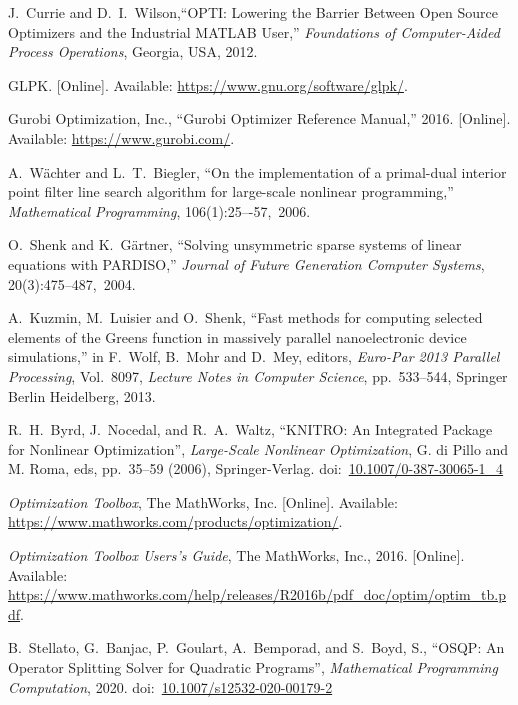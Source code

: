 \documentclass[12pt]{article}
\numberwithin{equation}{section}
\numberwithin{table}{section}
\numberwithin{figure}{section}
\begin{document}
\begin{thebibliography}{99}
J.~Currie and D.~I.~Wilson,``OPTI: Lowering the Barrier Between Open Source Optimizers and the Industrial MATLAB User,'' \emph{Foundations of Computer-Aided Process Operations}, Georgia, USA, 2012.

GLPK. [Online]. Available:
  \url{https://www.gnu.org/software/glpk/}.

Gurobi Optimization, Inc., ``Gurobi Optimizer Reference Manual,'' 2016. [Online]. Available:
  \url{https://www.gurobi.com/}.

A.~W\"achter and L.~T.~Biegler, ``On the implementation of a primal-dual interior point filter line search algorithm for large-scale nonlinear programming,'' \emph{Mathematical Programming}, 106(1):25–-57,~2006.

O.~Shenk and K.~G\"artner, ``Solving unsymmetric sparse systems of linear equations with PARDISO,'' \emph{Journal of Future Generation Computer Systems}, 20(3):475--487,~2004.

A.~Kuzmin, M.~Luisier and O.~Shenk, ``Fast methods for computing selected elements of the Greens function in massively parallel nanoelectronic device simulations,'' in F.~Wolf, B.~Mohr and D.~Mey, editors, \emph{Euro-Par 2013 Parallel Processing}, Vol.~8097, \emph{Lecture Notes in Computer Science}, pp.~533--544, Springer Berlin Heidelberg, 2013.

R.~H.~Byrd, J.~Nocedal, and R.~A.~Waltz, ``KNITRO: An Integrated Package for Nonlinear Optimization'', \emph{Large-Scale Nonlinear Optimization}, G. di Pillo and M. Roma, eds, pp.~35--59 (2006), Springer-Verlag.
doi:~\href{https://doi.org/10.1007/0-387-30065-1_4}{10.1007/0-387-30065-1\_4}

\emph{Optimization Toolbox}, The MathWorks, Inc.
  [Online]. Available: \url{https://www.mathworks.com/products/optimization/}.

\emph{Optimization Toolbox Users's Guide}, The MathWorks, Inc., 2016.
  [Online]. Available: \url{https://www.mathworks.com/help/releases/R2016b/pdf_doc/optim/optim_tb.pdf}.

B.~Stellato, G.~Banjac, P.~Goulart, A.~Bemporad, and S.~Boyd, S., ``{OSQP}: An Operator Splitting Solver for Quadratic Programs'', \emph{Mathematical Programming Computation}, 2020.
doi:~\href{https://doi.org/10.1007/s12532-020-00179-2}{10.1007/s12532-020-00179-2}

\end{thebibliography}
\end{document}
